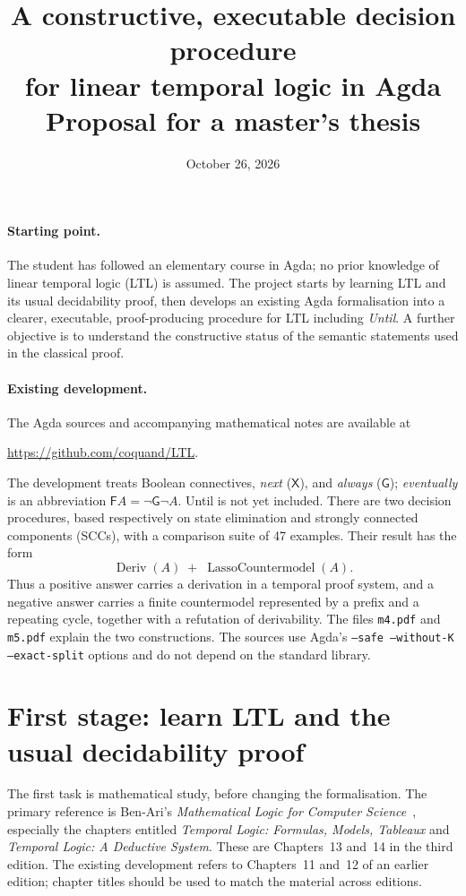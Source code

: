 \documentclass[11pt,a4paper]{article}
\title{A constructive, executable decision procedure\\
for linear temporal logic in Agda\\[4pt]
\large Proposal for a master's thesis}
\author{}
\date{October 26, 2026}
\newcommand{\Next}{\mathsf{X}}
\newcommand{\Always}{\mathsf{G}}
\newcommand{\Event}{\mathsf{F}}
\newcommand{\Deriv}{\operatorname{Deriv}}
\begin{document}
\maketitle

\paragraph{Starting point.}
The student has followed an elementary course in Agda; no prior knowledge
of linear temporal logic (LTL) is assumed. The project starts by learning
LTL and its usual decidability proof, then develops an existing Agda
formalisation into a clearer, executable, proof-producing procedure for
LTL including \emph{Until}. A further objective is to understand the
constructive status of the semantic statements used in the classical proof.

\paragraph{Existing development.}
The Agda sources and accompanying mathematical notes are available at
\begin{center}
\url{https://github.com/coquand/LTL}.
\end{center}
The development treats Boolean connectives, \emph{next} ($\Next$), and
\emph{always} ($\Always$); \emph{eventually} is an abbreviation
$\Event A=\neg\Always\neg A$. Until is not yet included.
There are two decision procedures, based respectively on state elimination
and strongly connected components (SCCs), with a comparison suite of
47 examples. Their result has the form
\[
 \Deriv(A)\; +\;\operatorname{LassoCountermodel}(A).
\]
Thus a positive answer carries a derivation in a temporal proof system,
and a negative answer carries a finite countermodel represented by a prefix
and a repeating cycle, together with a refutation of derivability.
The files \texttt{m4.pdf} and \texttt{m5.pdf} explain the two constructions.
The sources use Agda's \texttt{--safe --without-K --exact-split} options
and do not depend on the standard library.

\section{First stage: learn LTL and the usual decidability proof}

The first task is mathematical study, before changing the formalisation.
The primary reference is Ben-Ari's \emph{Mathematical Logic for Computer
Science}~\cite{benari}, especially the chapters entitled
\emph{Temporal Logic: Formulas, Models, Tableaux} and
\emph{Temporal Logic: A Deductive System}. These are Chapters~13 and~14
in the third edition. The existing development refers to Chapters~11
and~12 of an earlier edition; chapter titles should be used to match
the material across editions.
\end{document}
